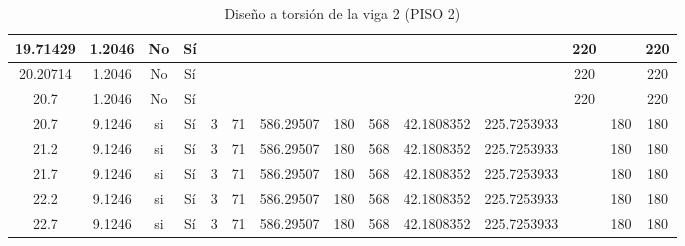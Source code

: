 \begin{table}[H]
{\begin{tabular}{|c|c|c|c|c|c|c|c|c|c|c|c|c|c|}
\hline
19.71429 & 1.2046 & No  & Sí  &     &     &     &     &     &     &     & 220 &     & 220 \bigstrut\\
\hline
20.20714 & 1.2046 & No  & Sí  &     &     &     &     &     &     &     & 220 &     & 220 \bigstrut\\
\hline
20.7 & 1.2046 & No  & Sí  &     &     &     &     &     &     &     & 220 &     & 220 \bigstrut\\
\hline
20.7 & 9.1246 & si  & Sí  & 3   & 71  & 586.29507 & 180 & 568 & 42.1808352 & 225.7253933 &     & 180 & 180 \bigstrut\\
\hline
21.2 & 9.1246 & si  & Sí  & 3   & 71  & 586.29507 & 180 & 568 & 42.1808352 & 225.7253933 &     & 180 & 180 \bigstrut\\
\hline
21.7 & 9.1246 & si  & Sí  & 3   & 71  & 586.29507 & 180 & 568 & 42.1808352 & 225.7253933 &     & 180 & 180 \bigstrut\\
\hline
22.2 & 9.1246 & si  & Sí  & 3   & 71  & 586.29507 & 180 & 568 & 42.1808352 & 225.7253933 &     & 180 & 180 \bigstrut\\
\hline
22.7 & 9.1246 & si  & Sí  & 3   & 71  & 586.29507 & 180 & 568 & 42.1808352 & 225.7253933 &     & 180 & 180 \bigstrut\\
\hline
\end{tabular}%

  
  

}
      \caption{Diseño a torsión de la viga 2 (PISO 2) }
  \label{tab:T VG2 P2 }%
\end{table}%
